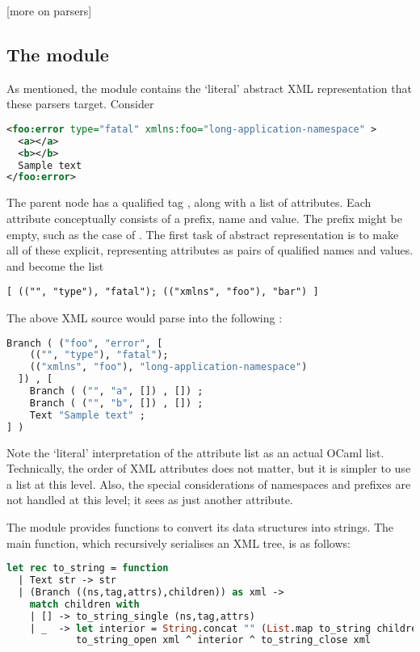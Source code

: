 \documentclass[12pt,a4paper,twoside,openright]{report}
\begin{document}
{[more on parsers]

\subsection{The  module}
As mentioned, the  module contains the `literal' abstract XML representation that these parsers target. Consider

\begin{lstlisting}[language=xml,label={lst:xmlsample}]
<foo:error type="fatal" xmlns:foo="long-application-namespace" >
  <a></a>
  <b></b>
  Sample text
</foo:error>
\end{lstlisting}

The parent node has a qualified tag , along with a list of attributes. Each attribute conceptually consists of a prefix, name and value. The prefix might be empty, such as the case of . The first task of abstract representation is to make all of these explicit, representing attributes as pairs of qualified names and values.  and  become the list
\begin{lstlisting}
[ (("", "type"), "fatal"); (("xmlns", "foo"), "bar") ]
\end{lstlisting}
The above XML source would parse into the following :

\begin{lstlisting}[language=ml]
Branch ( ("foo", "error", [
    (("", "type"), "fatal");
    (("xmlns", "foo"), "long-application-namespace")
  ]) , [
    Branch ( ("", "a", []) , []) ;
    Branch ( ("", "b", []) , []) ;
    Text "Sample text" ;
] )
\end{lstlisting}

Note the `literal' interpretation of the attribute list as an actual OCaml list. Technically, the order of XML attributes does not matter, but it is simpler to use a list at this level. Also, the special considerations of namespaces and prefixes are not handled at this level; it sees  as just another attribute.

The  module provides functions to convert its data structures into strings. The main  function, which recursively serialises an XML tree, is as follows:

\begin{lstlisting}[language=ml]
let rec to_string = function
  | Text str -> str
  | (Branch ((ns,tag,attrs),children)) as xml ->
    match children with
    | [] -> to_string_single (ns,tag,attrs)
    | _  -> let interior = String.concat "" (List.map to_string children) in
            to_string_open xml ^ interior ^ to_string_close xml
\end{lstlisting}

}
\end{document}

